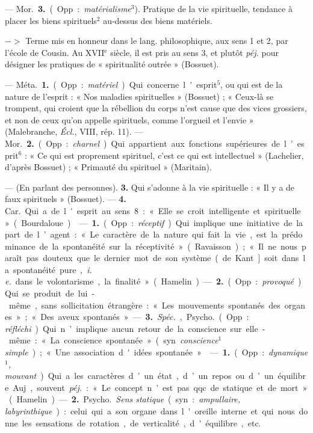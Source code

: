 \begin{itemize}[leftmargin=1cm, label=, itemsep=1pt]
—  \si{Mor.} {\bf 3.} (Opp. : {\it matérialisme}$^3$).
Pratique de la vie spirituelle, tendance à placer les biens
spirituels$^2$ au-dessus des biens matériels.

$->$ Terme mis en honneur dans le lang. philosophique, aux sens 1 et 2, par
l’école de Cousin. Au {\footnotesize XVII}$^\text{e}$ siècle, il est pris au
sens 3, et plutôt {\it péj.} pour désigner les pratiques de « spiritualité
outrée » (Bossuet).

 — \si{Méta.} {\bf 1.} (Opp. : {\it matériel}). Qui concerne
l'esprit$^5$, ou qui est de la nature de l'esprit : « Nos maladies
spirituelles » (Bossuet) ; « Ceux-là se trompent, qui croient que la
rébellion du corps n'est cause que des vices grossiers, et non de ceux
qu’on appelle spirituels, comme l’orgueil et l’envie » (Malebranche,
{\it Écl.}, VIII, rép. 11). — \si{Mor.} {\bf 2.} (Opp. : {\it charnel}). Qui
appartient aux fonctions supérieures de l’esprit$^6$ : « Ce qui est
proprement spirituel, c’est ce qui est intellectuel » (Lachelier, d’après
Bossuet) ; « Primauté du spirituel » (Maritain).

— (En parlant des personnes).  {\bf 3.} Qui s’adonne à la vie spirituelle : «
Il y a de faux spirituels » (Bossuet). — {\bf 4.} \si{Car.} Qui a de l'esprit
au sens 8: « Elle se croit intelligente et spirituelle » (Bourdaloue).

 — {\bf 1.} (Opp. : {\it réceptif}). Qui implique une initiative
de la part de l’agent : « Le caractère de la nature qui fait la vie, est la
prédominance de la spontanéité sur la réceptivité » (Ravaisson) ; « Il ne
nous paraît pas douteux que le dernier mot de son système (de Kant] soit dans
la spontanéité pure, {\it i. e.} dans le volontarisme, la finalité
» (Hamelin). — {\bf 2.} (Opp. : {\it provoqué}). Qui se produit de lui-même,
sans sollicitation étrangère : « Les mouvements spontanés des organes »; «
Des aveux spontanés ». — {\bf 3.} {\it Spéc.}, \si{Psycho.} (Opp. : {\it
réfléchi}). Qui n’implique aucun retour de la conscience sur elle-même : « La
conscience spontanée » (syn. {\it conscience$^1$ simple}) ; « Une association
d'idées spontanée ».

 — {\bf 1.} (Opp. : {\it dynamique$^1$, mouvant}). Qui a
les caractères d’un état, d’un repos ou d’un équilibre. Auj.,
souvent {\it péj.} : « Le concept n’est pas qqc. de statique et de mort
» (Hamelin). — {\bf 2.} \si{Psycho.} {\it Sens statique} (syn. :
{\it ampullaire, labyrinthique}) : celui qui a son organe dans l'oreille
interne et qui nous donne les sensations de rotation, de verticalité,
d'équilibre, etc.


\end{itemize}

